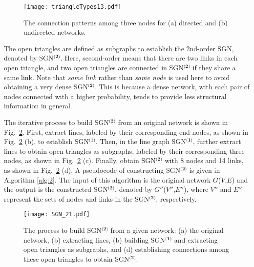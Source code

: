 \documentclass[10pt,journal,compsoc]{IEEEtran}
\begin{document}
\begin{figure}[!t]
	\centering
	\texttt{[image: triangleTypes13.pdf]}
	\caption{The connection patterns among three nodes for (a) directed and (b) undirected networks.}
	\label{fig:triangletypes}
\end{figure}

The open triangles are defined as subgraphs to establish the 2nd-order SGN, denoted by SGN$^{\textbf{(2)}}$. Here, second-order means that there are two links in each open triangle, and two open triangles are connected in SGN$^{\textbf{(2)}}$ if they share a same link. Note that \emph{same link} rather than \emph{same node} is used here to avoid obtaining a very dense SGN$^{\textbf{(2)}}$. This is because a dense network, with each pair of nodes connected with a higher probability, tends to provide less structural information in general.

The iterative process to build SGN$^{\textbf{(2)}}$ from an original network is shown in Fig.~\ref{fig:triangle}. First, extract lines, labeled by their corresponding end nodes, as shown in Fig.~\ref{fig:triangle} (b), to establish SGN$^{\textbf{(1)}}$. Then, in the line graph SGN$^{\textbf{(1)}}$, further extract lines to obtain open triangles as subgraphs, labeled by their corresponding three nodes, as shown in Fig.~\ref{fig:triangle} (c). Finally, obtain SGN$^{\textbf{(2)}}$ with 8 nodes and 14 links, as shown in Fig.~\ref{fig:triangle} (d). A pseudocode of constructing SGN$^{\textbf{(2)}}$ is given in Algorithm \ref{alg:2}. The input of this algorithm is the original network $G$($V$,$E$) and the output is the constructed SGN$^{\textbf{(2)}}$, denoted by $G''$($V''$,$E''$), where $V''$ and $E''$ represent the sets of nodes and links in the SGN$^{\textbf{(2)}}$, respectively.

\begin{figure}[!t]
	\centering
	\texttt{[image: SGN\_21.pdf]}
	\caption{The process to build SGN$^{\textbf{(2)}}$ from a given network: (a) the original network, (b) extracting lines, (b) building SGN$^{\textbf{(1)}}$ and extracting open triangles as subgraphs, and (d) establishing connections among these open triangles to obtain SGN$^{\textbf{(2)}}$.}
	\label{fig:triangle}
\end{figure}
\end{document}
